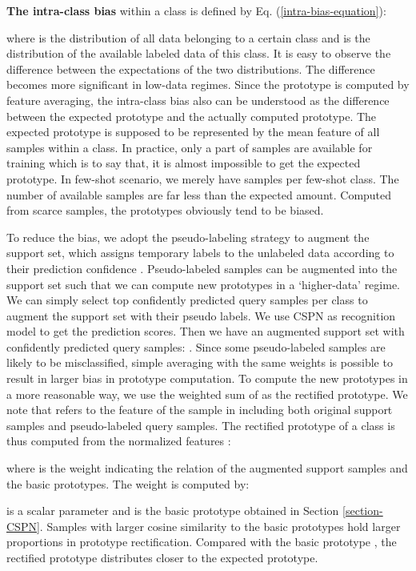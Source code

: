 \documentclass[runningheads]{llncs}
\begin{document}
\textbf{The intra-class bias} within a class is defined by Eq. (\ref{intra-bias-equation}):

where  is the distribution of all data belonging to a certain class and  is the distribution of the available labeled data of this class. It is easy to observe the difference between the expectations of the two distributions. The difference becomes more significant in low-data regimes. Since the prototype is computed by feature averaging, the intra-class bias also can be understood as the difference between the expected prototype and the actually computed prototype. The expected prototype is supposed to be represented by the mean feature of all samples within a class. In practice, only a part of samples are available for training which is to say that, it is almost impossible to get the expected prototype. In few-shot  scenario, we merely have  samples per few-shot class. The number of available samples are far less than the expected amount. Computed from scarce samples, the prototypes obviously tend to be biased.

To reduce the bias, we adopt the pseudo-labeling strategy to augment the support set, which assigns temporary labels to the unlabeled data according to their prediction confidence \cite{li2019learning}. Pseudo-labeled samples can be augmented into the support set such that we can compute new prototypes in a `higher-data' regime.
We can simply select top  confidently predicted query samples per class to augment the support set  with their pseudo labels. We use CSPN as recognition model to get the prediction scores. Then we have an augmented support set with confidently predicted query samples: .
Since some pseudo-labeled samples are likely to be misclassified, simple averaging with the same weights is possible to result in larger bias in prototype computation. To compute the new prototypes in a more reasonable way, we use the weighted sum of  as the rectified prototype.
We note that  refers to the feature of the sample in  including both original support samples and pseudo-labeled query samples. The rectified prototype of a class is thus computed from the normalized features :

where  is the weight indicating the relation of the augmented support samples and the basic prototypes. The weight is computed by:

 is a scalar parameter and  is the basic prototype obtained in Section \ref{section-CSPN}. Samples with larger cosine similarity to the basic prototypes hold larger proportions in prototype rectification. Compared with the basic prototype , the rectified prototype  distributes closer to the expected prototype. 
\end{document}
